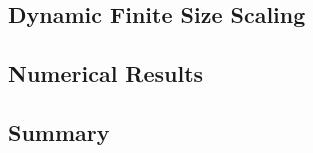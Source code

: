 \subsection{Dynamic Finite Size Scaling}





\subsection{Numerical Results}





\subsection{Summary}

